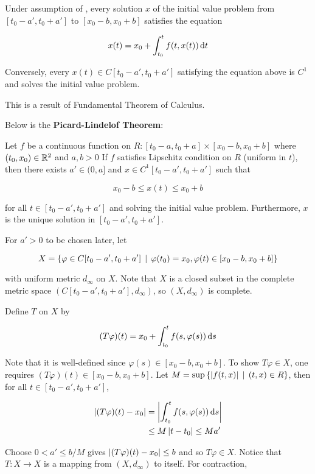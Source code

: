 \documentclass[a4paper,12pt]{article}
\begin{document}
\begin{pst}
  Under assumption of \rthm[\sctr{1}], every solution $x$ of the initial value problem from $[t_{0}-a',t_{0}+a']$ to $[x_{0}-b,x_{0}+b]$ satisfies the equation

  $$x(t)=x_{0}+\int_{t_{0}}^{t}f(t,x(t))\,\mathrm{d} t$$\s

  Conversely, every $x(t)\in C[t_{0}-a',t_{0}+a']$ satisfying the equation above is $C^{1}$ and solves the initial value problem.\n

  \prf This is a result of Fundamental Theorem of Calculus.
\end{pst}\n

Below is the \textbf{Picard-Lindelof Theorem}:\n

\begin{thm}
  Let $f$ be a continuous function on $R:[t_{0}-a,t_{0}+a]\times[x_{0}-b,x_{0}+b]$ where $(t_{0},x_{0})\in\mathbb{R}^{2}$ and $a,b>0$ If $f$ satisfies Lipschitz condition on $R$ (uniform in $t$), then there exists $a'\in(0,a]$ and $x\in C^{1}[t_{0}-a',t_{0}+a']$ such that

  $$x_{0}-b\leq x(t)\leq x_{0}+b$$\s

  for all $t\in[t_{0}-a',t_{0}+a']$ and solving the initial value problem. Furthermore, $x$ is the unique solution in $[t_{0}-a',t_{0}+a']$.\n

  \prf For $a'>0$ to be chosen later, let

  $$X=\left\{ \varphi\in C[t_{0}-a',t_{0}+a']\,\mid\,\varphi(t_{0})=x_{0},\varphi(t)\in[x_{0}-b,x_{0}+b]\right\}$$\s

  with uniform metric $d_{\infty}$ on $X$. Note that $X$ is a closed subset in the complete metric space $(C[t_{0}-a',t_{0}+a'],d_{\infty})$, so $(X,d_{\infty})$ is complete.\n

  Define $T$ on $X$ by

  $$(T\varphi)(t)=x_{0}+\int_{t_{0}}^{t}f(s,\varphi(s))\,\mathrm{d} s$$\s

  Note that it is well-defined since $\varphi(s)\in[x_{0}-b,x_{0}+b]$. To show $T\varphi\in X$, one requires $(T\varphi)(t)\in[x_{0}-b,x_{0}+b]$. Let $M=\sup\left\{ \left| f(t,x)\right|\,\mid\, (t,x)\in R\right\}$, then for all $t\in[t_{0}-a',t_{0}+a']$,

  $$\begin{aligned}[t]
    \left| (T\varphi)(t)-x_{0}\right|&=\left| \int_{t_{0}}^{t}f(s,\varphi(s))\,\mathrm{d} s\right|\\
    &\leq M\left| t-t_{0}\right|\leq Ma'
  \end{aligned}$$\s

  Choose $0<a'\leq b/M$ gives $\left| (T\varphi)(t)-x_{0}\right|\leq b$ and so $T\varphi\in X$. Notice that $T:X\to X$ is a mapping from $(X,d_{\infty})$ to itself. For contraction,


\end{thm}
\end{document}
